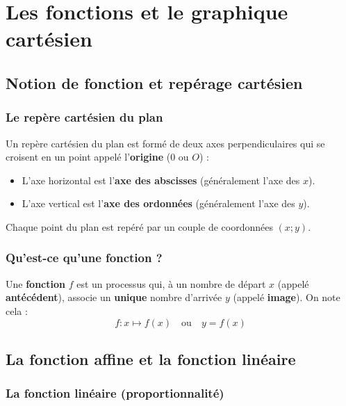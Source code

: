 \documentclass[../main.tex]{subfiles}
\begin{document}
\ifSubfilesClassLoaded{\PageLegaleChapitre}{}

\chapter{Les fonctions et le graphique cartésien}
\label{chap:fonctions-et-graphiques}

\section{Notion de fonction et repérage cartésien}

\subsection{Le repère cartésien du plan}
Un repère cartésien du plan est formé de deux axes perpendiculaires qui se croisent en un point appelé l'\textbf{origine} ($0$ ou $O$) :
\begin{itemize}
  \item L'axe horizontal est l'\textbf{axe des abscisses} (généralement l'axe des $x$).
  \item L'axe vertical est l'\textbf{axe des ordonnées} (généralement l'axe des $y$).
\end{itemize}
Chaque point du plan est repéré par un couple de coordonnées $(x; y)$.

\subsection{Qu'est-ce qu'une fonction ?}
\begin{definition}
Une \textbf{fonction} $f$ est un processus qui, à un nombre de départ $x$ (appelé \textbf{antécédent}), associe un \textbf{unique} nombre d'arrivée $y$ (appelé \textbf{image}). On note cela :
\[
f : x \longmapsto f(x) \quad\text{ou}\quad y = f(x)
\]
\end{definition}

\section{La fonction affine et la fonction linéaire}

\subsection{La fonction linéaire (proportionnalité)}
\end{document}
